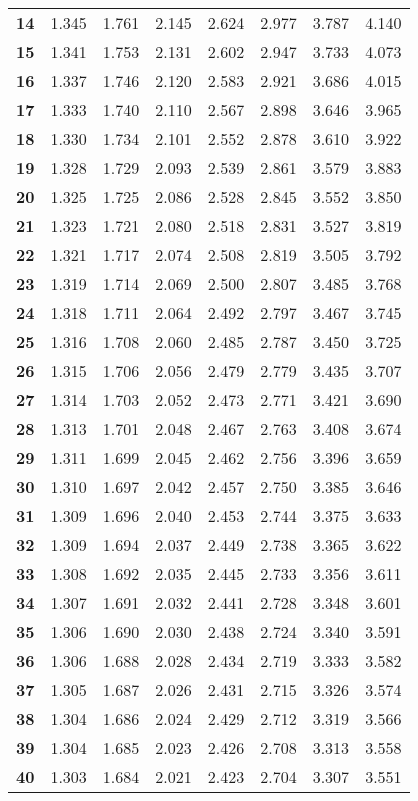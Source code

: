 \begin{center}
\begin{tabular}{c|c|c|c|c|c|c|c}
\textbf{14} & 1.345 & 1.761 & 2.145  & 2.624  & 2.977  & 3.787   & 4.140   \\
\textbf{15} & 1.341 & 1.753 & 2.131  & 2.602  & 2.947  & 3.733   & 4.073   \\
\textbf{16} & 1.337 & 1.746 & 2.120  & 2.583  & 2.921  & 3.686   & 4.015   \\
\textbf{17} & 1.333 & 1.740 & 2.110  & 2.567  & 2.898  & 3.646   & 3.965   \\
\textbf{18} & 1.330 & 1.734 & 2.101  & 2.552  & 2.878  & 3.610   & 3.922   \\
\textbf{19} & 1.328 & 1.729 & 2.093  & 2.539  & 2.861  & 3.579   & 3.883   \\
\textbf{20} & 1.325 & 1.725 & 2.086  & 2.528  & 2.845  & 3.552   & 3.850   \\
\textbf{21} & 1.323 & 1.721 & 2.080  & 2.518  & 2.831  & 3.527   & 3.819   \\
\textbf{22} & 1.321 & 1.717 & 2.074  & 2.508  & 2.819  & 3.505   & 3.792   \\
\textbf{23} & 1.319 & 1.714 & 2.069  & 2.500  & 2.807  & 3.485   & 3.768   \\
\textbf{24} & 1.318 & 1.711 & 2.064  & 2.492  & 2.797  & 3.467   & 3.745   \\
\textbf{25} & 1.316 & 1.708 & 2.060  & 2.485  & 2.787  & 3.450   & 3.725   \\
\textbf{26} & 1.315 & 1.706 & 2.056  & 2.479  & 2.779  & 3.435   & 3.707   \\
\textbf{27} & 1.314 & 1.703 & 2.052  & 2.473  & 2.771  & 3.421   & 3.690   \\
\textbf{28} & 1.313 & 1.701 & 2.048  & 2.467  & 2.763  & 3.408   & 3.674   \\
\textbf{29} & 1.311 & 1.699 & 2.045  & 2.462  & 2.756  & 3.396   & 3.659   \\
\textbf{30} & 1.310 & 1.697 & 2.042  & 2.457  & 2.750  & 3.385   & 3.646   \\
\textbf{31} & 1.309 & 1.696 & 2.040  & 2.453  & 2.744  & 3.375   & 3.633   \\
\textbf{32} & 1.309 & 1.694 & 2.037  & 2.449  & 2.738  & 3.365   & 3.622   \\
\textbf{33} & 1.308 & 1.692 & 2.035  & 2.445  & 2.733  & 3.356   & 3.611   \\
\textbf{34} & 1.307 & 1.691 & 2.032  & 2.441  & 2.728  & 3.348   & 3.601   \\
\textbf{35} & 1.306 & 1.690 & 2.030  & 2.438  & 2.724  & 3.340   & 3.591   \\
\textbf{36} & 1.306 & 1.688 & 2.028  & 2.434  & 2.719  & 3.333   & 3.582   \\
\textbf{37} & 1.305 & 1.687 & 2.026  & 2.431  & 2.715  & 3.326   & 3.574   \\
\textbf{38} & 1.304 & 1.686 & 2.024  & 2.429  & 2.712  & 3.319   & 3.566   \\
\textbf{39} & 1.304 & 1.685 & 2.023  & 2.426  & 2.708  & 3.313   & 3.558   \\
\textbf{40} & 1.303 & 1.684 & 2.021  & 2.423  & 2.704  & 3.307   & 3.551  \bstrut\\
\hline
\end{tabular}
\end{center}